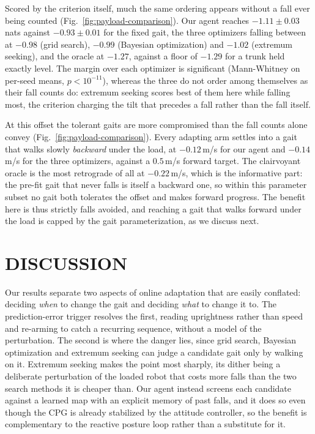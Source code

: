 \documentclass[lettersize,journal]{IEEEtran}
\begin{document}
Scored by the criterion itself, much the same ordering appears without a fall ever being counted (Fig.~\ref{fig:payload-comparison}).
Our agent reaches $-1.11 \pm 0.03$\,nats against $-0.93 \pm 0.01$ for the fixed gait, the three optimizers falling between at $-0.98$ (grid search), $-0.99$ (Bayesian optimization) and $-1.02$ (extremum seeking), and the oracle at $-1.27$, against a floor of $-1.29$ for a trunk held exactly level.
The margin over each optimizer is significant (Mann-Whitney on per-seed means, $p < 10^{-11}$), whereas the three do not order among themselves as their fall counts do: extremum seeking scores best of them here while falling most, the criterion charging the tilt that precedes a fall rather than the fall itself.

At this offset the tolerant gaits are more compromised than the fall counts alone convey (Fig.~\ref{fig:payload-comparison}).
Every adapting arm settles into a gait that walks slowly \emph{backward} under the load, at $-0.12$\,m/s for our agent and $-0.14$\,m/s for the three optimizers, against a $0.5$\,m/s forward target.
The clairvoyant oracle is the most retrograde of all at $-0.22$\,m/s, which is the informative part: the pre-fit gait that never falls is itself a backward one, so within this parameter subset no gait both tolerates the offset and makes forward progress.
The benefit here is thus strictly falls avoided, and reaching a gait that walks forward under the load is capped by the gait parameterization, as we discuss next.

\section{DISCUSSION}
\label{sec:discussion}

Our results separate two aspects of online adaptation that are easily conflated: deciding \emph{when} to change the gait and deciding \emph{what} to change it to.
The prediction-error trigger resolves the first, reading uprightness rather than speed and re-arming to catch a recurring sequence, without a model of the perturbation.
The second is where the danger lies, since grid search, Bayesian optimization and extremum seeking can judge a candidate gait only by walking on it.
Extremum seeking makes the point most sharply, its dither being a deliberate perturbation of the loaded robot that costs more falls than the two search methods it is cheaper than.
Our agent instead screens each candidate against a learned map with an explicit memory of past falls, and it does so even though the CPG is already stabilized by the attitude controller, so the benefit is complementary to the reactive posture loop rather than a substitute for it.
\end{document}
